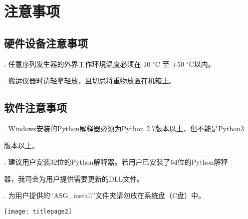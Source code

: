 \chapter{\heiti 注意事项}
\section{\heiti 硬件设备注意事项}
. 任意序列发生器的外界工作环境温度必须在-10 $^{\circ}$C 至 +50 $^{\circ}$C以内。

. 搬运仪器时请轻拿轻放，且切忌将重物放置在机箱上。

\section{\heiti 软件注意事项}
. Windows安装的Python解释器必须为Python 2.7版本以上，但不能是Python3

\hspace{-0.3em}版本以上。

. 建议用户安装32位的Python解释器。若用户已安装了64位的Python解释

\hspace{-0.3em}器，我司会为用户提供需要更新的DLL文件。

. 为用户提供的“ASG\_install”文件夹请勿放在系统盘（C盘）中。
%
\newpage
\qquad

\newpage
\qquad
\thispagestyle{empty}

\newpage
\begin{center}
\texttt{[image: titlepage2]}
\end{center}

